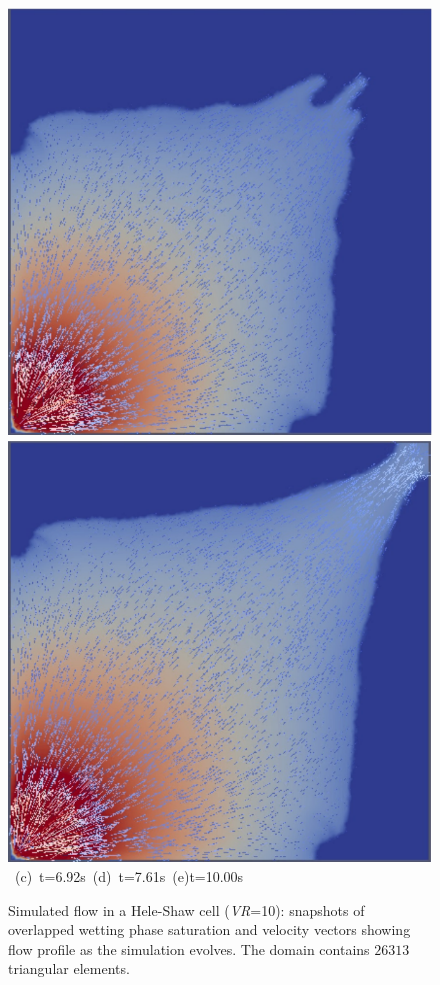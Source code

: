 \begin{landscape}
\begin{figure}[ht]
{{      \includegraphics[width=.5\textwidth]{./Pics1/Saffman_homogeneous_VR10/ST_Homog_VR10_D2201c}
      \includegraphics[width=.5\textwidth]{./Pics1/Saffman_homogeneous_VR10/ST_Homog_VR10_D3001c}}
\vspace{0.cm}
\hbox{ \hspace{2.cm} (c) t=6.92s \hspace{4.5cm} (d) t=7.61s \hspace{4.5cm} (e)t=10.00s}
\vspace{0.cm}
}   
\caption{Simulated flow in a Hele-Shaw cell ({\it VR}=10): snapshots of overlapped wetting phase saturation and velocity vectors showing flow profile as the simulation evolves. The domain contains $26313$  triangular elements.}
\label{fig:homoheleshaw_VN10}
\end{figure}
\end{landscape}
\clearpage

